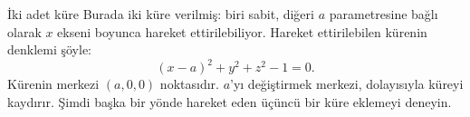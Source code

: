 \begin{surferPage}{İki adet küre}
Burada iki küre verilmiş: biri sabit, diğeri $a$ parametresine bağlı olarak $x$ ekseni boyunca hareket ettirilebiliyor. Hareket ettirilebilen kürenin denklemi şöyle:
\[(x-a)^2+y^2+z^2-1=0.\]
Kürenin merkezi $(a,0,0)$ noktasıdır. $a$'yı değiştirmek merkezi, dolayısıyla küreyi kaydırır.
Şimdi başka bir yönde hareket eden üçüncü bir küre eklemeyi deneyin.
\end{surferPage}

